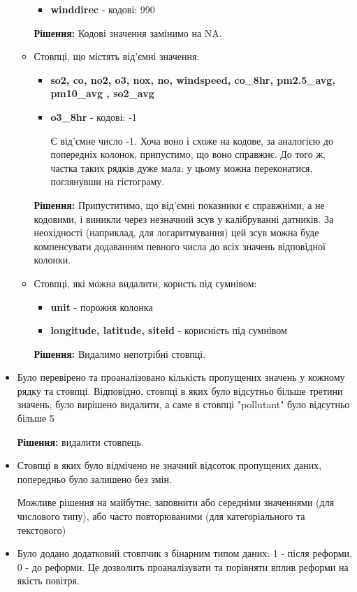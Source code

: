\documentclass[./report.tex]{subfiles}
\begin{document}
\begin{itemize}
\begin{itemize}
\begin{itemize}
          \item \textbf{winddirec} - кодові: 990
        \end{itemize}

        \textbf{Рішення:} Кодові значення замінимо на NA.

        \item Стовпці, що містять від'ємні значення:

        \begin{itemize}
          \item \textbf{so2, co, no2,  o3, nox, no, windspeed, co\_8hr, pm2.5\_avg, pm10\_avg , so2\_avg}

          \item \textbf{o3\_8hr} - кодові: -1

          Є від'ємне число -1. Хоча воно і схоже на кодове, за аналогією до попередніх колонок,
          припустимо, що воно справжнє. До того ж, частка таких рядків дуже мала: у цьому можна
          переконатися, поглянувши на гістограму.
        \end{itemize}

        \textbf{Рішення:} Припуститимо, що від'ємні показники є справжніми, а не кодовими, і
        виникли через незначний зсув у калібруванні датників.
        За неохідності (наприклад, для логаритмування) цей зсув можна буде компенсувати
        додаванням певного числа до всіх значень відповідної колонки.

        \item Стовпці, які можна видалити, користь під сумнівом:

        \begin{itemize}
          \item \textbf{unit} - порожня колонка
          \item \textbf{longitude, latitude, siteid} - корисність під сумнівом
        \end{itemize}

        \textbf{Рішення:} Видалимо непотрібні стовпці.
      \end{itemize}

  \item Було перевірено та проаналізовано кількість пропущених значень у кожному рядку та стовпці.
  Відповідно, стовпці в яких було відсутньо більше третини значень, було вирішено видалити,
  а саме в стовпці "pollutant" було відсутньо більше 5%

  \textbf{Рішення:} видалити стовпець.

  \item Стовпці в яких було відмічено не значний відсоток пропущених даних,
  попередньо було залишено без змін.

  Можливе рішення на майбутнє: заповнити або середніми значеннями (для числового типу),
  або часто повторюваними (для категоріального та текстового)

  \item Було додано додатковий стовпчик з бінарним типом даних: 1 - після реформи, 0 - до реформи.
  Це дозволить проаналізувати та порівняти вплив реформи на якість повітря.
\end{itemize}
\end{document}
